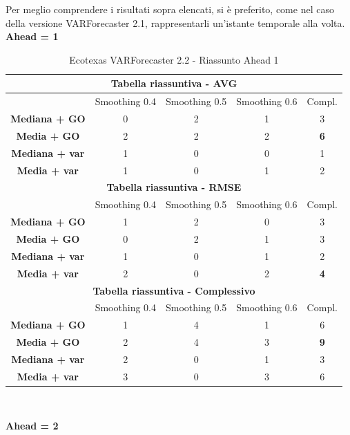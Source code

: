 \documentclass[12pt,a4paper,oneside,openright]{book}
\begin{document}
Per meglio comprendere i risultati sopra elencati, si è preferito, come nel caso della versione VARForecaster 2.1, rappresentarli un'istante temporale alla volta. \\

\newpage
\textbf{Ahead = 1}

\medskip

\begin{table}[H]
\centering
\begin{tabular}{|c|c|c|c|c|}
\hline
\multicolumn{5}{|c|}{\textbf{Tabella riassuntiva - AVG}} \\
\hline
& Smoothing 0.4 & Smoothing 0.5 & Smoothing 0.6 & Compl.\\
\hline
\textbf{Mediana + GO} & 0 & 2 & 1 & 3\\ 
\hline
\textbf{Media + GO} & 2 & 2 & 2 & \textbf{6}\\ 
\hline
\textbf{Mediana + var} & 1 & 0 & 0 & 1\\ 
\hline
\textbf{Media + var} & 1 & 0 & 1 & 2\\ 
\hline
\multicolumn{5}{|c|}{\textbf{Tabella riassuntiva - RMSE}} \\
\hline
& Smoothing 0.4 & Smoothing 0.5 & Smoothing 0.6 & Compl.\\
\hline
\textbf{Mediana + GO} & 1 & 2 & 0 & 3\\ 
\hline
\textbf{Media + GO} & 0 & 2 & 1 & 3\\ 
\hline
\textbf{Mediana + var} & 1 & 0 & 1 & 2\\ 
\hline
\textbf{Media + var} & 2 & 0 & 2 & \textbf{4}\\ 
\hline
\multicolumn{5}{|c|}{\textbf{Tabella riassuntiva - Complessivo}} \\
\hline
& Smoothing 0.4 & Smoothing 0.5 & Smoothing 0.6 & Compl.\\
\hline
\textbf{Mediana + GO} & 1 & 4 & 1 & 6\\ 
\hline
\textbf{Media + GO} & 2 & 4 & 3 & \textbf{9}\\ 
\hline
\textbf{Mediana + var} & 2 & 0 & 1 & 3\\ 
\hline
\textbf{Media + var} & 3 & 0 & 3 & 6\\ 
\hline
\end{tabular} \\ 
\caption{Ecotexas VARForecaster 2.2 - Riassunto Ahead 1}
\end{table}

\newpage

\textbf{Ahead = 2}

\medskip
\end{document}
